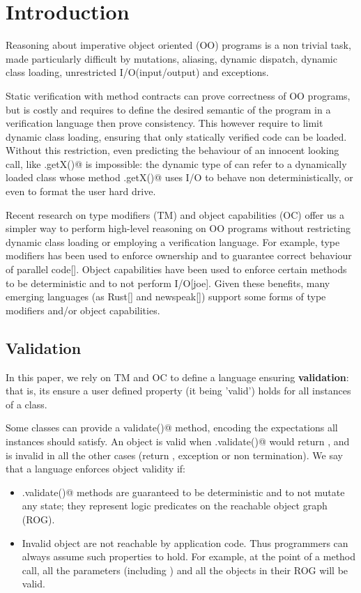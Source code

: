 
\section{Introduction}
\saveSpace\saveSpace
Reasoning about imperative object oriented (OO) programs is a non trivial task,
made particularly difficult by mutations, aliasing, dynamic dispatch, dynamic class loading,
unrestricted I/O(input/output) and exceptions.

Static verification with method contracts can prove correctness of OO programs, but is costly and requires to define the desired semantic of the program in a verification language then prove consistency.
This however require to limit dynamic class loading, ensuring that only statically verified code can be loaded.
Without this restriction, even predicting the behaviour of an innocent looking call, like 
\Q@myPoint.getX()@ is impossible: the dynamic type of \Q@myPoint@ can refer to a dynamically loaded class
whose method \Q@.getX()@ uses I/O to behave non deterministically, or even to format the user hard drive.

Recent research on type modifiers (TM) and object capabilities (OC) offer us a simpler way to perform high-level reasoning on OO programs without restricting dynamic class loading or employing a verification language.
For example, type modifiers has been used to enforce ownership and to guarantee correct behaviour of
parallel code[]. Object capabilities have been used to enforce certain methods to be deterministic and to not perform I/O[joe].
Given these benefits, many emerging languages (as Rust[] and newspeak[])
support some forms of type modifiers and/or object capabilities.

\vspace{1ex}

\subsection{Validation}
In this paper, we rely on TM and OC to define a language ensuring \textbf{validation}: that is, its ensure a user defined property (it being 'valid') holds for all instances of a class.

Some classes can provide a \Q@Bool validate()@ method, encoding the expectations
all instances should satisfy.
An object \Q@o@ is valid when \Q@o.validate()@ would return \Q@true@, and is invalid in all the other cases (return \Q@false@, exception or non termination).
We say that a language enforces object validity if:
\begin{itemize}
\item \Q@.validate()@ methods are guaranteed to be deterministic and to not mutate any state; they represent logic predicates on the reachable object graph (ROG).
\item Invalid object are not reachable by application code. Thus programmers can always assume such properties to hold.
For example, at the point of a method call,
all the parameters (including \Q@this@) and all the objects in their ROG will be valid.
\end{itemize}

